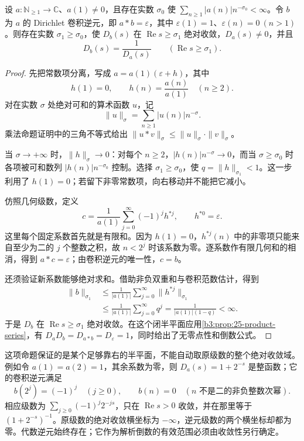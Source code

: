 \begin{proposition}[卷积逆元的解析表示]\label{b3:prop:25-inverse-series}
设 \(a:\mathbb N_{\ge1}\to\mathbb C\)、\(a(1)\ne0\)，且存在实数 \(\sigma_0\) 使 \(\sum_{n\ge1}|a(n)|n^{-\sigma_0}<\infty\)。令 \(b\) 为 \(a\) 的 Dirichlet 卷积逆元，即 \(a*b=\varepsilon\)，其中 \(\varepsilon(1)=1\)、\(\varepsilon(n)=0\ (n>1)\)。则存在实数 \(\sigma_1\ge\sigma_0\)，使 \(D_b(s)\) 在 \(\operatorname{Re}s\ge\sigma_1\) 绝对收敛，\(D_a(s)\ne0\)，并且
\[
 D_b(s)=\frac1{D_a(s)}\qquad(\operatorname{Re}s\ge\sigma_1).
\]
\end{proposition}
\begin{proof}
先把常数项分离，写成 \(a=a(1)(\varepsilon+h)\)，其中
\[
 h(1)=0,\qquad h(n)=\frac{a(n)}{a(1)}\quad(n\ge2).
\]
对在实数 \(\sigma\) 处绝对可和的算术函数 \(u\)，记
\[
 \|u\|_{\sigma}=\sum_{n\ge1}|u(n)|n^{-\sigma}.
\]
乘法命题证明中的三角不等式给出
\(\|u*v\|_{\sigma}\le\|u\|_{\sigma}\cdot\|v\|_{\sigma}\)。

当 \(\sigma\to+\infty\) 时，\(\|h\|_{\sigma}\to0\)：对每个 \(n\ge2\)，\(|h(n)|n^{-\sigma}\to0\)，而当 \(\sigma\ge\sigma_0\) 时各项被可和数列 \(|h(n)|n^{-\sigma_0}\) 控制。选择 \(\sigma_1\ge\sigma_0\)，使 \(q=\|h\|_{\sigma_1}<1\)。这一步利用了 \(h(1)=0\)；若留下非零常数项，向右移动并不能把它减小。

仿照几何级数，定义
\[
 c=\frac1{a(1)}\sum_{j=0}^{\infty}(-1)^j h^{*j},
 \qquad h^{*0}=\varepsilon.
\]
这里每个固定系数首先就是有限和。因为 \(h(1)=0\)，\(h^{*j}(n)\) 中的非零项只能来自至少为二的 \(j\) 个整数之积，故 \(n<2^j\) 时该系数为零。逐系数作有限几何和的相消，得到 \(a*c=\varepsilon\)；由卷积逆元的唯一性，\(c=b\)。

还须验证新系数能够绝对求和。借助非负双重和与卷积范数估计，得到
\[
 \begin{split}
 \|b\|_{\sigma_1}
 &\le\frac1{|a(1)|}
       \sum_{j=0}^{\infty}\|h^{*j}\|_{\sigma_1}\\
 &\le\frac1{|a(1)|}\sum_{j=0}^{\infty}q^j
 =\frac1{|a(1)|(1-q)}<\infty.
 \end{split}
\]
于是 \(D_b\) 在 \(\operatorname{Re}s\ge\sigma_1\) 绝对收敛。在这个闭半平面应用\cref{b3:prop:25-product-series}，有 \(D_aD_b=D_{a*b}=D_{\varepsilon}=1\)，同时给出了无零点性和倒数公式。
\end{proof}

这项命题保证的是某个足够靠右的半平面，不能自动取原级数的整个绝对收敛域。例如令 \(a(1)=a(2)=1\)，其余系数为零，则 \(D_a(s)=1+2^{-s}\) 是整函数；它的卷积逆元满足
\[
 b(2^j)=(-1)^j\quad(j\ge0),\qquad
 b(n)=0\quad(n\text{ 不是二的非负整数次幂}).
\]
相应级数为 \(\sum_{j\ge0}(-1)^j2^{-js}\)，只在 \(\operatorname{Re}s>0\) 收敛，并在那里等于 \((1+2^{-s})^{-1}\)。原级数的绝对收敛横坐标为 \(-\infty\)，逆元级数的两个横坐标却都为零。代数逆元始终存在；它作为解析倒数的有效范围必须由收敛性另行确定。
